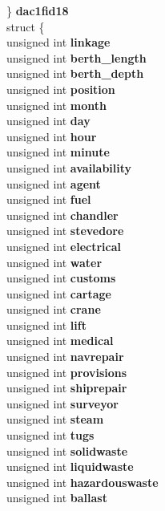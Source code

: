 \begin{DoxyCompactItemize}
{\begin{tabbing}
{\>\>\>\} {\bfseries dac1fid18}\\
\>\>\>struct \{\\
\>\>\>\>unsigned int {\bfseries linkage}\\
\>\>\>\>unsigned int {\bfseries berth\_length}\\
\>\>\>\>unsigned int {\bfseries berth\_depth}\\
\>\>\>\>unsigned int {\bfseries position}\\
\>\>\>\>unsigned int {\bfseries month}\\
\>\>\>\>unsigned int {\bfseries day}\\
\>\>\>\>unsigned int {\bfseries hour}\\
\>\>\>\>unsigned int {\bfseries minute}\\
\>\>\>\>unsigned int {\bfseries availability}\\
\>\>\>\>unsigned int {\bfseries agent}\\
\>\>\>\>unsigned int {\bfseries fuel}\\
\>\>\>\>unsigned int {\bfseries chandler}\\
\>\>\>\>unsigned int {\bfseries stevedore}\\
\>\>\>\>unsigned int {\bfseries electrical}\\
\>\>\>\>unsigned int {\bfseries water}\\
\>\>\>\>unsigned int {\bfseries customs}\\
\>\>\>\>unsigned int {\bfseries cartage}\\
\>\>\>\>unsigned int {\bfseries crane}\\
\>\>\>\>unsigned int {\bfseries lift}\\
\>\>\>\>unsigned int {\bfseries medical}\\
\>\>\>\>unsigned int {\bfseries navrepair}\\
\>\>\>\>unsigned int {\bfseries provisions}\\
\>\>\>\>unsigned int {\bfseries shiprepair}\\
\>\>\>\>unsigned int {\bfseries surveyor}\\
\>\>\>\>unsigned int {\bfseries steam}\\
\>\>\>\>unsigned int {\bfseries tugs}\\
\>\>\>\>unsigned int {\bfseries solidwaste}\\
\>\>\>\>unsigned int {\bfseries liquidwaste}\\
\>\>\>\>unsigned int {\bfseries hazardouswaste}\\
\>\>\>\>unsigned int {\bfseries ballast}\\
}
\end{tabbing}}
\end{DoxyCompactItemize}
